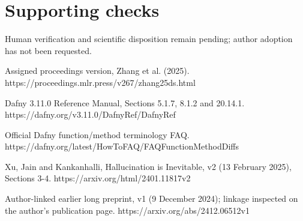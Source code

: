 \documentclass[10pt]{article}
\begin{document}
\section*{Supporting checks}
Human verification and scientific disposition remain pending; author adoption has not been requested.\par
Assigned proceedings version, Zhang et al. (2025). https://proceedings.mlr.press/v267/zhang25ds.html\par
Dafny 3.11.0 Reference Manual, Sections 5.1.7, 8.1.2 and 20.14.1. https://dafny.org/v3.11.0/DafnyRef/DafnyRef\par
Official Dafny function/method terminology FAQ. https://dafny.org/latest/HowToFAQ/FAQFunctionMethodDiffs\par
Xu, Jain and Kankanhalli, Hallucination is Inevitable, v2 (13 February 2025), Sections 3-4. https://arxiv.org/html/2401.11817v2\par
Author-linked earlier long preprint, v1 (9 December 2024); linkage inspected on the author’s publication page. https://arxiv.org/abs/2412.06512v1\par
\end{document}
